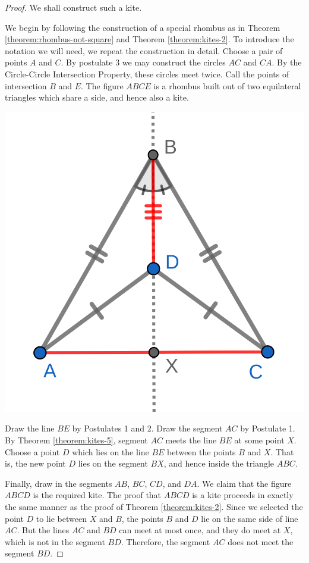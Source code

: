 \documentclass{tufte-handout}
\theoremstyle{definition}
\begin{document}
\begin{proof}
We shall construct such a kite.

We begin by following the construction of a special rhombus as in Theorem \ref{theorem:rhombus-not-square} and Theorem \ref{theorem:kites-2}. To introduce the notation we will need, we repeat the construction in detail. Choose a pair of points $A$ and $C$. By postulate 3 we may construct the circles $AC$ and $CA$. By the Circle-Circle Intersection Property, these circles meet twice. Call the points of intersection $B$ and $E$. The figure $ABCE$ is a rhombus built out of two equilateral triangles which share a side, and hence also a kite.

\begin{marginfigure}
  \includegraphics{images/boomerang.png}
\end{marginfigure}


Draw the line $BE$ by Postulates 1 and 2. Draw the segment $AC$ by Postulate 1. By Theorem \ref{theorem:kites-5}, segment $AC$ meets the line $BE$ at some point $X$. Choose a point $D$ which lies on the line $BE$ between the points $B$ and $X$. That is, the new point $D$ lies on the segment $BX$, and hence inside the triangle $ABC$.

Finally, draw in the segments $AB$, $BC$, $CD$, and $DA$. We claim that the figure $ABCD$ is the required kite. The proof that $ABCD$ is a kite proceeds in exactly the same manner as the proof of Theorem \ref{theorem:kites-2}. Since we selected the point $D$ to lie between $X$ and $B$, the points $B$ and $D$ lie on the same side of line $AC$. But the lines $AC$ and $BD$ can meet at most once, and they do meet at $X$, which is not in the segment $BD$. Therefore, the segment $AC$ does not meet the segment $BD$.
\end{proof}
\end{document}
